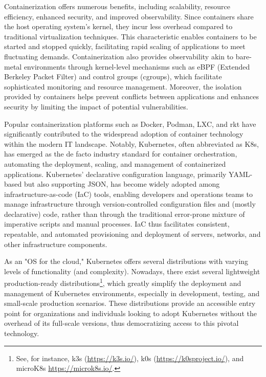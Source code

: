 \documentclass{easychair}
\begin{document}
Containerization offers numerous benefits, including scalability, resource efficiency, enhanced security, and improved observability. Since containers share the host operating system's kernel, they incur less overhead compared to traditional virtualization techniques. This characteristic enables containers to be started and stopped quickly, facilitating rapid scaling of applications to meet fluctuating demands. Containerization also provides observability akin to bare-metal environments through kernel-level mechanisms such as eBPF (Extended Berkeley Packet Filter) and control groups (cgroups), which facilitate sophisticated monitoring and resource management. Moreover, the isolation provided by containers helps prevent conflicts between applications and enhances security by limiting the impact of potential vulnerabilities.


Popular containerization platforms such as Docker, Podman, LXC, and rkt have significantly contributed to the widespread adoption of container technology within the modern IT landscape. Notably, Kubernetes, often abbreviated as K8s, has emerged as the de facto industry standard for container orchestration, automating the deployment, scaling, and management of containerized applications. Kubernetes' declarative configuration language, primarily YAML-based but also supporting JSON, has become widely adopted among infrastructure-as-code (IaC) tools, enabling developers and operations teams to manage infrastructure through version-controlled configuration files and (mostly declarative) code, rather than through the traditional error-prone mixture of imperative scripts and manual processes. IaC thus facilitates consistent, repeatable, and automated provisioning and deployment of servers, networks, and other infrastructure components.

As an "OS for the cloud," Kubernetes offers several distributions with varying levels of functionality (and complexity). Nowadays, there exist several lightweight production-ready distributions\footnote{See, for instance, k3s (\url{https://k3s.io/}), k0s (\url{https://k0sproject.io/}), and microK8s \url{https://microk8s.io/}.}, which greatly simplify the deployment and management of Kubernetes environments, especially in development, testing, and small-scale production scenarios. These distributions provide an accessible entry point for organizations and individuals looking to adopt Kubernetes without the overhead of its full-scale versions, thus democratizing access to this pivotal technology.
\end{document}
